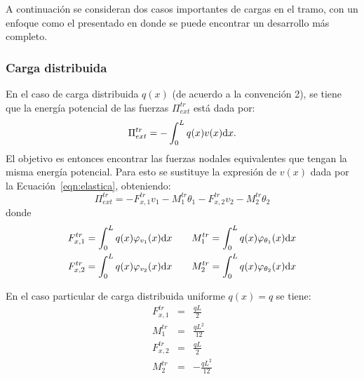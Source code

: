 A continuación se consideran dos casos importantes de cargas en el tramo, con un enfoque como el presentado en \citep{Onate2013} donde se puede encontrar un desarrollo más completo. %

\subsubsection{Carga distribuida}

En el caso de carga distribuida $q(x)$ (de acuerdo a la convención 2), se tiene que la energía potencial de las fuerzas $\Pi^{tr}_{ext}$ está dada por:
%
\begin{equation}
\Pi_{ext}^{tr} =
- \int_0^L q(x) v(x) {\text{d}} x.
\end{equation}
%
El objetivo es entonces encontrar las fuerzas nodales equivalentes que tengan la misma energía potencial. Para esto se sustituye la expresión de $v(x)$ dada por la Ecuación~\eqref{eqn:elastica}, obteniendo:
%
\begin{equation}
\Pi_{ext}^{tr} =
-F_{x,1}^{tr} v_1 - M_1^{tr} \theta_1 -F_{x,2}^{tr} v_2 -  M_2^{tr} \theta_2
\end{equation}
donde
\begin{eqnarray}
F_{x,1}^{tr} = \int_{0}^{L} q(x) \varphi_{v_1}(x) {\text{d}} x \qquad & \displaystyle M_1^{tr} = \int_{0}^{L}q(x) \varphi_{\theta_1}(x)  {\text{d}} x  \nonumber\\
F_{x,2}^{tr} = \int_{0}^{L}q(x) \varphi_{v_2}(x)  {\text{d}} x \qquad & \displaystyle M_2^{tr} = \int_{0}^{L} q(x)\varphi_{\theta_2}(x)  {\text{d}} x  \nonumber
\end{eqnarray}

En el caso particular de carga distribuida uniforme $q(x) = q$ se tiene:
%
\begin{eqnarray}
F_{x,1}^{tr} &=& \frac{q L}{2} \\
M_1^{tr} &=& \frac{q L^{2}}{12} \\
F_{x,2}^{tr} &=& \frac{q L}{2} \\
M_2^{tr} &=& - \frac{q L^{2}}{12}
\end{eqnarray}


